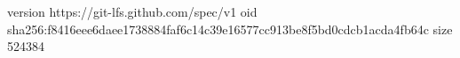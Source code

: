 version https://git-lfs.github.com/spec/v1
oid sha256:f8416eee6daee1738884faf6c14c39e16577cc913be8f5bd0cdcb1acda4fb64c
size 524384

